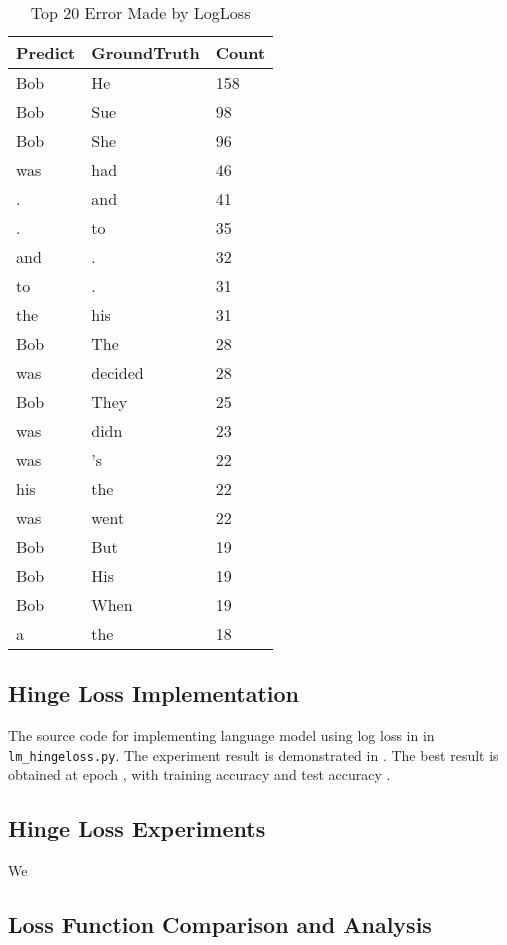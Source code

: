 \documentclass{article}
\begin{document}
\begin{table}
\centering
\begin{tabular}{l|l|l}
\textbf{Predict} & \textbf{GroundTruth} & \textbf{Count}\\
\hline
Bob&He&158\\
\hline
Bob&Sue&98\\
\hline
Bob&She&96\\
\hline
was&had&46\\
\hline
.&and&41\\
\hline
.&to&35\\
\hline
and&.&32\\
\hline
to&.&31\\
\hline
the&his&31\\
\hline
Bob&The&28\\
\hline
was&decided&28\\
\hline
Bob&They&25\\
\hline
was&didn&23\\
\hline
was&'s&22\\
\hline
his&the&22\\
\hline
was&went&22\\
\hline
Bob&But&19\\
\hline
Bob&His&19\\
\hline
Bob&When&19\\
\hline
a&the&18 \\
\end{tabular}
\caption{Top 20 Error Made by LogLoss}
\label{tab:logloss_top20}
\end{table}

\subsection{Hinge Loss Implementation}
The source code for implementing language model using log loss in in \texttt{lm\_hingeloss.py}. The experiment result is demonstrated in . The best result is obtained at epoch , with training accuracy and test accuracy .

\subsection{Hinge Loss Experiments}

We 

\subsection{Loss Function Comparison and Analysis}
\end{document}

